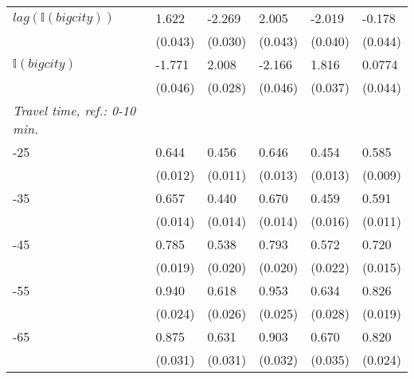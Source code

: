 \begin{table}[h!]
\begin{tabular}{p{5cm} p{2cm}p{2cm}p{2cm}p{2cm}p{2cm}}
$lag(\mathbb{I}{(bigcity)})$      &       1.622\sym{***}&      -2.269\sym{***}&       2.005\sym{***}&      -2.019\sym{***}&      -0.178\sym{***}\\
                    &     (0.043)         &     (0.030)         &     (0.043)         &     (0.040)         &     (0.044)         \\

$\mathbb{I}{(bigcity)}$          &      -1.771\sym{***}&       2.008\sym{***}&      -2.166\sym{***}&       1.816\sym{***}&      0.0774         \\
                    &     (0.046)         &     (0.028)         &     (0.046)         &     (0.037)         &     (0.044)         \\

\textit{Travel time, ref.: 0-10 min.} \\
\MyIndent 15-25               &       0.644\sym{***}&       0.456\sym{***}&       0.646\sym{***}&       0.454\sym{***}&       0.585\sym{***}\\
                    &     (0.012)         &     (0.011)         &     (0.013)         &     (0.013)         &     (0.009)         \\

\MyIndent 25-35               &       0.657\sym{***}&       0.440\sym{***}&       0.670\sym{***}&       0.459\sym{***}&       0.591\sym{***}\\
                    &     (0.014)         &     (0.014)         &     (0.014)         &     (0.016)         &     (0.011)         \\

\MyIndent 35-45               &       0.785\sym{***}&       0.538\sym{***}&       0.793\sym{***}&       0.572\sym{***}&       0.720\sym{***}\\
                    &     (0.019)         &     (0.020)         &     (0.020)         &     (0.022)         &     (0.015)         \\

\MyIndent 45-55               &       0.940\sym{***}&       0.618\sym{***}&       0.953\sym{***}&       0.634\sym{***}&       0.826\sym{***}\\
                    &     (0.024)         &     (0.026)         &     (0.025)         &     (0.028)         &     (0.019)         \\

\MyIndent 55-65               &       0.875\sym{***}&       0.631\sym{***}&       0.903\sym{***}&       0.670\sym{***}&       0.820\sym{***}\\
                    &     (0.031)         &     (0.031)         &     (0.032)         &     (0.035)         &     (0.024)         \\


\end{tabular}
\end{table}
